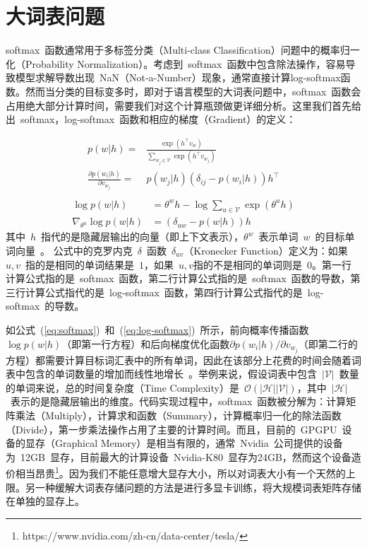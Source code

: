 \section{大词表问题}
softmax~函数通常用于多标签分类（Multi-class Classification）问题中的概率归一化（Probability Normalization）。考虑到~softmax~函数中包含除法操作，容易导致模型求解导数出现~NaN（Not-a-Number）现象，通常直接计算log-softmax函数。然而当分类的目标变多时，即对于语言模型的大词表问题中，softmax~函数会占用绝大部分计算时间，需要我们对这个计算瓶颈做更详细分析。这里我们首先给出~softmax，log-softmax~函数和相应的梯度（Gradient）的定义：

\begin{equation}\label{eq:softmax}
\begin{split}
p(w|h)=&\frac{\exp(h^\top v_{w})}{\sum_{w_j\in \mathcal{V}}{\exp(h^\top v_{w_j} )}} \\
\frac{\partial p(w_i|h)}{\partial v_{w_j}}=&p(w_j|h)(\delta_{ij}-p(w_i|h))h^\top\\
\end{split}
\end{equation}
\begin{equation}
\label{eq:log-softmax}
\begin{split}
\log p(w|h) &= \theta^w h-\log \sum_{u\in \mathcal{V}}{\exp(\theta^u h)}\\
\nabla_{\theta^u}{\log p(w|h)}&= (\delta_{uw}-p(w|h))h
\end{split}
\end{equation}
其中~$h$~指代的是隐藏层输出的向量（即上下文表示），$\theta^w$~表示单词~$w$~的目标单词向量~。
公式中的克罗内克~$\delta$~函数~$\delta_{uv}$（Kronecker Function）定义为：如果~$u,v$~指的是相同的单词结果是~$1$，如果~$u,v$指的不是相同的单词则是~$0$。第一行计算公式指的是~softmax~函数，第二行计算公式指的是~softmax~函数的导数，第三行计算公式指代的是~log-softmax~函数，第四行计算公式指代的是~log-softmax~的导数。


如公式~(\ref{eq:softmax})~和~(\ref{eq:log-softmax})~所示，前向概率传播函数~$\log p(w|h)$（即第一行方程）和后向梯度优化函数${\partial p(w_i|h)}/{\partial v_{w_j}}$（即第二行的方程）都需要计算目标词汇表中的所有单词，因此在该部分上花费的时间会随着词表中包含的单词数量的增加而线性地增长~。举例来说，假设词表中包含~$\mathcal{|V|}$~数量的单词来说，总的时间复杂度（Time Complexity）是~$\mathcal{O}(\mathcal{|H||V|})$，其中~$\mathcal{|H|}$~表示的是隐藏层输出的维度。代码实现过程中，softmax~函数被分解为：计算矩阵乘法（Multiply），计算求和函数（Summary），计算概率归一化的除法函数（Divide），第一步乘法操作占用了主要的计算时间。而且，目前的~GPGPU~设备的显存（Graphical Memory）是相当有限的，通常~Nvidia~公司提供的设备为~12GB~显存，目前最大的计算设备~Nvidia-K80~显存为24GB，然而这个设备造价相当昂贵\footnote{https://www.nvidia.com/zh-cn/data-center/tesla/}。因为我们不能任意增大显存大小，所以对词表大小有一个天然的上限。另一种缓解大词表存储问题的方法是进行多显卡训练，将大规模词表矩阵存储在单独的显存上。

